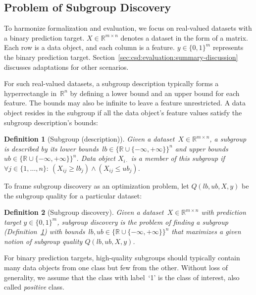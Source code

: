 \documentclass[acmsmall]{acmart} %
\theoremstyle{acmplain}
\theoremstyle{acmdefinition}
\newtheorem{definition}{Definition}
\begin{document}
\subsection{Problem of Subgroup Discovery}
\label{sec:csd:fundamentals:problem}

To harmonize formalization and evaluation, we focus on real-valued datasets with a binary prediction target.
$X \in \mathbb{R}^{m \times n}$ denotes a dataset in the form of a matrix.
Each row is a data object, and each column is a feature.
$y \in \{0, 1\}^m$ represents the binary prediction target.
Section~\ref{sec:csd:evaluation:summary-discussion} discusses adaptations for other scenarios.

For such real-valued datasets, a subgroup description typically forms a hyperrectangle in~$\mathbb{R}^n$ by defining a lower bound and an upper bound for each feature.
The bounds may also be infinite to leave a feature unrestricted.
A data object resides in the subgroup if all the data object's feature values satisfy the subgroup description's bounds:
%
\begin{definition}[Subgroup (description)]
	Given a dataset~$X \in \mathbb{R}^{m \times n}$, a \emph{subgroup} is described by its lower bounds~$\mathit{lb} \in \{\mathbb{R} \cup \{-\infty, +\infty\}\}^n$ and upper bounds~$\mathit{ub} \in \{\mathbb{R} \cup \{-\infty, +\infty\}\}^n$.
	Data object $X_{i \cdot}$ is a \emph{member} of this subgroup if $\forall j \in \{1, \dots, n\}:~ \left( X_{ij} \geq \mathit{lb}_j \right) \land \left( X_{ij} \leq \mathit{ub}_j \right)$.
	\label{def:csd:subgroup}
\end{definition}
%
To frame subgroup discovery as an optimization problem, let $Q(\mathit{lb}, \mathit{ub}, X, y)$ be the subgroup quality for a particular dataset:
%
\begin{definition}[Subgroup discovery]
	Given a dataset~$X \in \mathbb{R}^{m \times n}$ with prediction target $y \in \{0, 1\}^m$,
	\emph{subgroup discovery} is the problem of finding a subgroup (Definition~\ref{def:csd:subgroup}) with bounds~$\mathit{lb}, \mathit{ub} \in \{\mathbb{R} \cup \{-\infty, +\infty\}\}^n$ that maximizes a given notion of subgroup quality $Q(\mathit{lb}, \mathit{ub}, X, y)$.
	\label{def:csd:subgroup-discovery}
\end{definition}
%
For binary prediction targets, high-quality subgroups should typically contain many data objects from one class but few from the other.
Without loss of generality, we assume that the class with label~`1' is the class of interest, also called \emph{positive} class.
\end{document}
